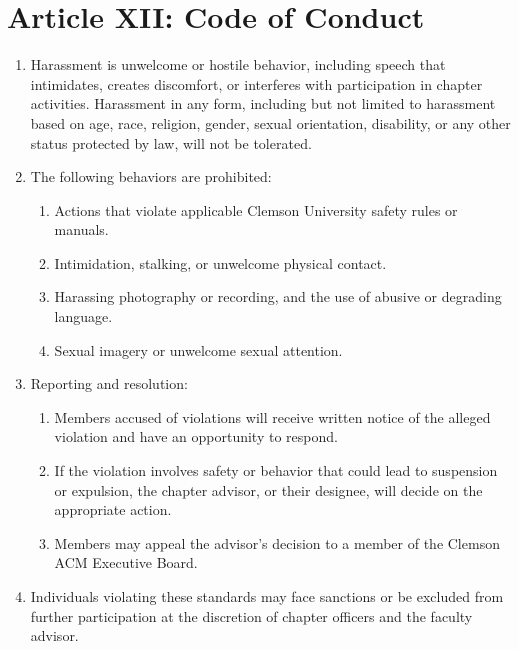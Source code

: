 \section*{Article XII: Code of Conduct}

\begin{enumerate}
    \item Harassment is unwelcome or hostile behavior, including speech that intimidates, creates discomfort, or interferes with participation in chapter activities. Harassment in any form, including but not limited to harassment based on age, race, religion, gender, sexual orientation, disability, or any other status protected by law, will not be tolerated.
    \item The following behaviors are prohibited:
    \begin{enumerate}
        \item Actions that violate applicable Clemson University safety rules or manuals.
        \item Intimidation, stalking, or unwelcome physical contact.
        \item Harassing photography or recording, and the use of abusive or degrading language.
        \item Sexual imagery or unwelcome sexual attention.
    \end{enumerate}
    \item Reporting and resolution:
    \begin{enumerate}
        \item Members accused of violations will receive written notice of the alleged violation and have an opportunity to respond.
        \item If the violation involves safety or behavior that could lead to suspension or expulsion, the chapter advisor, or their designee, will decide on the appropriate action.
        \item Members may appeal the advisor’s decision to a member of the Clemson ACM Executive Board.
    \end{enumerate}
    \item Individuals violating these standards may face sanctions or be excluded from further participation at the discretion of chapter officers and the faculty advisor.
\end{enumerate}
